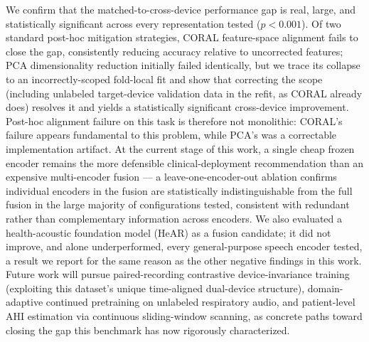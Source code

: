 \documentclass[conference]{IEEEtran}
\begin{document}
We confirm that the matched-to-cross-device performance gap is real, large, and statistically significant across every representation tested ($p<0.001$). Of two standard post-hoc mitigation strategies, CORAL feature-space alignment fails to close the gap, consistently reducing accuracy relative to uncorrected features; PCA dimensionality reduction initially failed identically, but we trace its collapse to an incorrectly-scoped fold-local fit and show that correcting the scope (including unlabeled target-device validation data in the refit, as CORAL already does) resolves it and yields a statistically significant cross-device improvement. Post-hoc alignment failure on this task is therefore not monolithic: CORAL's failure appears fundamental to this problem, while PCA's was a correctable implementation artifact. At the current stage of this work, a single cheap frozen encoder remains the more defensible clinical-deployment recommendation than an expensive multi-encoder fusion --- a leave-one-encoder-out ablation confirms individual encoders in the fusion are statistically indistinguishable from the full fusion in the large majority of configurations tested, consistent with redundant rather than complementary information across encoders. We also evaluated a health-acoustic foundation model (HeAR) as a fusion candidate; it did not improve, and alone underperformed, every general-purpose speech encoder tested, a result we report for the same reason as the other negative findings in this work. Future work will pursue paired-recording contrastive device-invariance training (exploiting this dataset's unique time-aligned dual-device structure), domain-adaptive continued pretraining on unlabeled respiratory audio, and patient-level AHI estimation via continuous sliding-window scanning, as concrete paths toward closing the gap this benchmark has now rigorously characterized.
\end{document}
